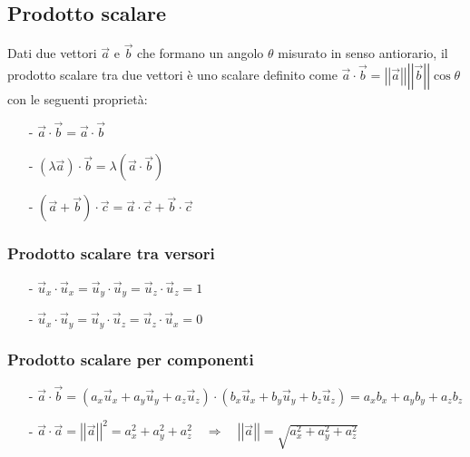\documentclass[a4paper]{article}
\newcommand\ux{\vec{u}_x}
\newcommand\uy{\vec{u}_y}
\newcommand\uz{\vec{u}_z}
\newcommand\vmod[1]{\left|\left|{#1}\right|\right|}
\begin{document}
\subsection{Prodotto scalare}
Dati due vettori \(\vec{a}\) e \(\vec{b}\) che formano un angolo \(\theta\) misurato in senso antiorario, il prodotto scalare tra
due vettori è uno scalare definito come \(\vec{a} \cdot \vec{b} = \vmod{\vec{a}} \vmod{\vec{b}} \cos \theta\)
con le seguenti proprietà:
\begin{itemize}[topsep=3pt, itemsep=0pt]
	\item[-] \(\vec{a} \cdot \vec{b} = \vec{a} \cdot \vec{b}\)
	\item[-] \((\lambda \vec{a}) \cdot \vec{b} = \lambda (\vec{a} \cdot \vec{b})\)
	\item[-] \((\vec{a} + \vec{b}) \cdot \vec{c} = \vec{a} \cdot \vec{c} + \vec{b} \cdot \vec{c}\)
\end{itemize}

\subsubsection*{Prodotto scalare tra versori}
\begin{itemize}[topsep=3pt, itemsep=0pt]
	\item[-] \(\ux \cdot \ux = \uy \cdot \uy = \uz \cdot \uz = 1\)
	\item[-] \(\ux \cdot \uy = \uy \cdot \uz = \uz \cdot \ux = 0\)
\end{itemize}

\subsubsection*{Prodotto scalare per componenti}
\begin{itemize}[topsep=3pt, itemsep=0pt]
	\item[-] \(\vec{a} \cdot \vec{b} = \left(a_x \ux + a_y \uy + a_z \uz\right) \cdot \left(b_x \ux + b_y \uy + b_z \uz\right) = a_x b_x + a_y b_y + a_z b_z\)
	\item[-] \(\vec{a} \cdot \vec{a} = \vmod{\vec{a}}^2 = a_x^2 + a_y^2 + a_z^2 \quad \Rightarrow \quad \vmod{\vec{a}} = \sqrt{a_x^2 + a_y^2 + a_z^2}\)
\end{itemize}
\end{document}
